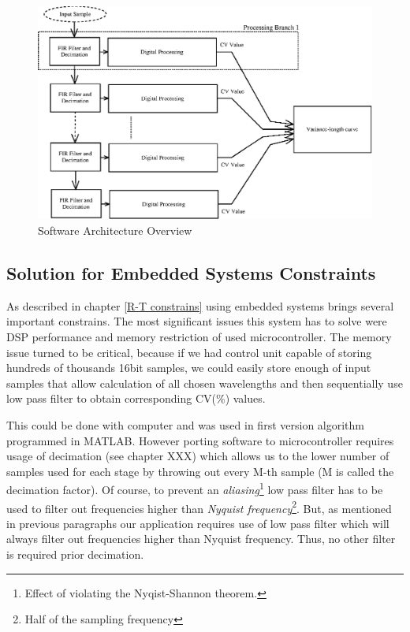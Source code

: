 \documentclass[twoside]{ctuthesis}
\theoremstyle{plain}
\theoremstyle{definition}
\theoremstyle{note}
\begin{document}
\begin{figure}[h]
	\centering
	\includegraphics[width=1.0\textwidth]{system_overview.eps}
	\caption{Software Architecture Overview}
	\label{fig:software_overview}
\end{figure}

\subsection{Solution for Embedded Systems Constraints}
\label{sec:SolutionForEmbedded}
As described in chapter \ref{R-T constrains} using embedded systems brings several important constrains. The most significant issues this system has to solve were DSP performance and memory restriction of used microcontroller. The memory issue turned to be critical, because if we had control unit capable of storing hundreds of thousands 16bit samples, we could easily store enough of input samples that allow calculation of all chosen wavelengths and then sequentially use low pass filter to obtain corresponding CV(\%) values. 

This could be done with computer and was used in first version algorithm programmed in MATLAB. However porting software to microcontroller requires usage of decimation (see chapter XXX) which allows us to the lower number of samples used for each stage by throwing out every M-th sample (M is called the decimation factor). Of course, to prevent an \textit{aliasing}\footnote{Effect of violating the Nyqist-Shannon theorem.} low pass filter has to be used to filter out frequencies higher than \textit{Nyquist frequency}\footnote{Half of the sampling frequency}. But, as mentioned in previous paragraphs our application requires use of low pass filter which will always filter out frequencies higher than Nyquist frequency. Thus, no other filter is required prior decimation.
\end{document}

